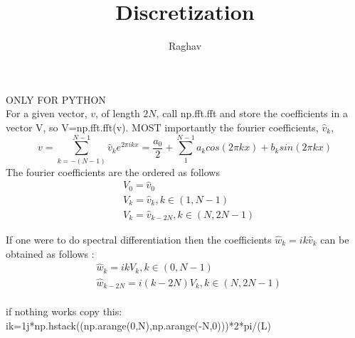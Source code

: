 \documentclass[12pt,twoside]{article}
\title{Discretization}
\author{Raghav}
\begin{document}
ONLY FOR PYTHON\\
For a given vector, $v$, of length $2N$, call np.fft.fft and store the coefficients in a vector V, so V=np.fft.fft(v). MOST importantly the fourier coefficients,  $\hat{v}_k$,
\begin{equation}
v=\sum \limits_{k=-(N-1)}^{N-1}\hat{v}_k e^{2 \pi ik x}=\frac{a_0}{2} + \sum \limits_{1}^{N-1}a_k cos(2\pi kx) + b_k sin(2\pi kx)
\end{equation}
The fourier coefficients are the ordered as follows
\begin{align}
&V_0 =\hat{v}_0 \\
&V_k  =\hat{v}_k    , k \in (1, N-1)  \\
&V_k =\hat{v}_{k-2N}  ,  k \in (N,2N-1)
\end{align}


If one were to do spectral differentiation then the coefficients $\hat{w}_k=ik\hat{v}_k $ can be obtained as follows :
\begin{align}
&\hat{w}_k=ikV_k , k \in(0,N-1)\\
&\hat{w}_{k-2N}=i(k-2N)V_k, k \in (N,2N-1)
\end{align} 

\paragraph{}
if nothing works copy this:
\\
    ik=1j*np.hstack((np.arange(0,N),np.arange(-N,0)))*2*pi/(L)
\end{document}
